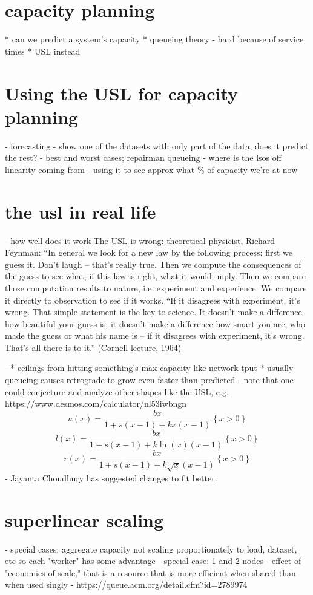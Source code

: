 \documentclass{vivid_layout_pdf}
\begin{document}
\section{capacity planning}
      * can we predict a system’s capacity
		    * queueing theory - hard because of service times
			     * USL instead
\section{Using the USL for capacity planning}
  - forecasting
  - show one of the datasets with only part of the data, does it predict the
  rest?
  - best and worst cases; repairman queueing
  - where is the lsos off linearity coming from
  - using it to see approx what \% of capacity we're at now
\section{the usl in real life}
  - how well does it work
	The USL is wrong:
	theoretical physicist, Richard Feynman:
	“In general we look for a new law by the following process: first we guess it.
	Don’t laugh -- that’s really true. Then we compute the consequences of the guess
	to see what, if this law is right, what it would imply. Then we compare those
	computation results to nature, i.e. experiment and experience. We compare it
	directly to observation to see if it works.
	“If it disagrees with experiment, it’s wrong. That simple statement is the key
	to science. It doesn’t make a difference how beautiful your guess is, it doesn’t
	make a difference how smart you are, who made the guess or what his name is --
	if it disagrees with experiment, it’s wrong. That’s all there is to it.”
	(Cornell lecture, 1964)

  - 
      * ceilings from hitting something’s max capacity like network tput
		    * usually queueing causes retrograde to grow even faster than
			 predicted
	- note that one could conjecture and analyze other shapes like the USL, e.g.
	https://www.desmos.com/calculator/nl53iwbngn
	\[
	u\left(x\right)=\frac{bx}{1+s\left(x-1\right)+kx\left(x-1\right)}\left\{x>0\right\}
	\]
	\[
	l\left(x\right)=\frac{bx}{1+s\left(x-1\right)+k\ln\left(x\right)\left(x-1\right)}\left\{x>0\right\}
	\]
	\[
	r\left(x\right)=\frac{bx}{1+s\left(x-1\right)+k\sqrt{x}\left(x-1\right)}\left\{x>0\right\}
	\]
	- Jayanta Choudhury has suggested changes to fit better.
\section{superlinear scaling}
	- special cases: aggregate capacity not scaling proportionately to load,
	dataset, etc so each "worker" has some advantage
	- special case: 1 and 2 nodes
	- effect of "economies of scale," that is a resource that is more efficient
	when shared than when used singly
	- https://queue.acm.org/detail.cfm?id=2789974
\end{document}
